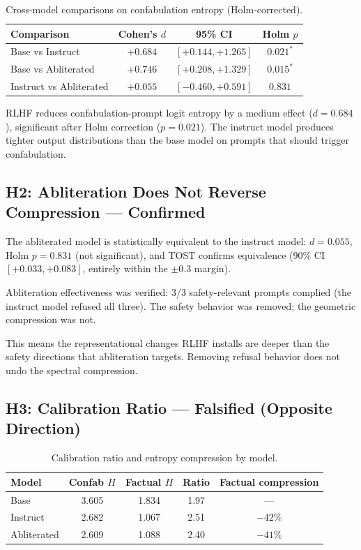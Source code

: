 \documentclass[11pt,a4paper]{article}
\begin{document}
\begin{table}[ht]
\centering
\small
\caption{Cross-model comparisons on confabulation entropy
  (Holm-corrected).}
\label{tab:crossmodel}
\begin{tabular}{lccc}
\toprule
\textbf{Comparison} & \textbf{Cohen's $d$} & \textbf{95\% CI} & \textbf{Holm $p$} \\
\midrule
Base vs Instruct & $+0.684$ & $[+0.144, +1.265]$ & $0.021^*$ \\
Base vs Abliterated & $+0.746$ & $[+0.208, +1.329]$ & $0.015^*$ \\
Instruct vs Abliterated & $+0.055$ & $[-0.460, +0.591]$ & $0.831$ \\
\bottomrule
\end{tabular}
\end{table}

RLHF reduces confabulation-prompt logit entropy by a medium effect
($d{=}0.684$), significant after Holm correction ($p{=}0.021$). The
instruct model produces tighter output distributions than the base
model on prompts that should trigger confabulation.

\subsection{H2: Abliteration Does Not Reverse Compression --- Confirmed}

The abliterated model is statistically equivalent to the instruct
model: $d{=}0.055$, Holm $p{=}0.831$ (not significant), and TOST
confirms equivalence (90\% CI $[+0.033, +0.083]$, entirely within
the $\pm 0.3$ margin).

Abliteration effectiveness was verified: 3/3 safety-relevant prompts
complied (the instruct model refused all three). The safety behavior
was removed; the geometric compression was not.

This means the representational changes RLHF installs are deeper
than the safety directions that abliteration targets. Removing
refusal behavior does not undo the spectral compression.

\subsection{H3: Calibration Ratio --- Falsified (Opposite Direction)}

\begin{table}[ht]
\centering
\small
\caption{Calibration ratio and entropy compression by model.}
\label{tab:calibration}
\begin{tabular}{lcccc}
\toprule
\textbf{Model} & \textbf{Confab $H$} & \textbf{Factual $H$}
  & \textbf{Ratio} & \textbf{Factual compression} \\
\midrule
Base & 3.605 & 1.834 & 1.97 & --- \\
Instruct & 2.682 & 1.067 & 2.51 & $-42\%$ \\
Abliterated & 2.609 & 1.088 & 2.40 & $-41\%$ \\
\bottomrule
\end{tabular}
\end{table}
\end{document}
